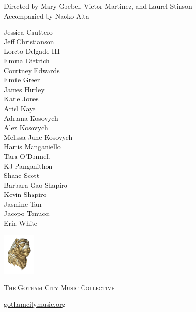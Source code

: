 \documentclass{article}[10pt]
\newcommand{\lion}{
    {\includegraphics[width=0.125\textwidth]{goldie_head.png}}
}
\begin{document}
\begin{titlepage}
\begin{center}
{\begin{small}
Directed by
Mary Goebel,
Victor Martinez,
and
Laurel Stinson\\
Accompanied by Naoko Aita
\end{small}
\vspace{-0.1in}
\begin{multicols*}{3}
\begin{center}
    \begin{small}
        Jessica Cauttero \\ 
        Jeff Christianson \\
        Loreto Delgado III \\        
        Emma Dietrich \\   
        Courtney Edwards \\
        Emile Greer \\
        James Hurley \\        
        Katie Jones \\        
        Ariel Kaye \\
        Adriana Kosovych \\        
        Alex Kosovych \\        
        {Melissa June Kosovych} \\
        Harris Manganiello \\
        Tara O'Donnell \\
        KJ Panganithon \\
        Shane Scott \\
        {Barbara Gao Shapiro} \\
        Kevin Shapiro \\
        Jasmine Tan \\
        Jacopo Tonucci \\
        Erin White
    \end{small}
\end{center}
\end{multicols*}
}


\newpage

{\lion}

\vspace{0.2in}

{\scshape \large
    The Gotham City Music Collective
\par}
{\large{
    \href{https://gothamcitymusic.org}{gothamcitymusic.org}
}}

\vspace{0.2in}
    
\begin{minipage}{4in}


\end{minipage}
\end{center}
\end{titlepage}
\end{document}
